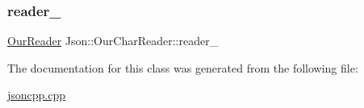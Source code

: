 \mbox{\label{classJson_1_1OurCharReader_aedd4520b8570654ed7aa0726075ee58d_aedd4520b8570654ed7aa0726075ee58d}} 
\subsubsection{\texorpdfstring{reader\+\_\+}{reader\_}}
{\footnotesize\ttfamily \hyperlink{classJson_1_1OurReader}{Our\+Reader} Json\+::\+Our\+Char\+Reader\+::reader\+\_\+\hspace{0.3cm}{\ttfamily [private]}}



The documentation for this class was generated from the following file\+:\begin{DoxyCompactItemize}
\item 
\hyperlink{jsoncpp_8cpp}{jsoncpp.\+cpp}\end{DoxyCompactItemize}
